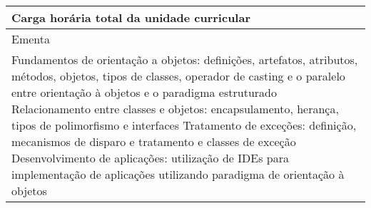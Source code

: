 \begin{quadro}[ht!]
\begin{tabular}{|p{3cm} p{2cm} p{3cm} p{2cm} p{3cm} p{2cm}|}
\multicolumn{5}{|p{13cm}|}{\cellcolor{blue1} Carga horária total da unidade curricular} & \multicolumn{1}{p{1cm}|}{\raggedleft 90	}\\\hline
\multicolumn{6}{|p{15cm}|}{\cellcolor{blue1} Ementa} \\\hline
\hline\multicolumn{6}{|p{15cm}|}{\scriptsize Fundamentos de orientação a objetos: definições, artefatos, atributos, métodos, objetos, tipos de classes, operador de casting e o paralelo entre orientação à objetos e o paradigma estruturado Relacionamento entre classes e objetos: encapsulamento, herança, tipos de polimorfismo e interfaces Tratamento de exceções: definição, mecanismos de disparo e tratamento e classes de exceção Desenvolvimento de aplicações: utilização de IDEs para implementação de aplicações utilizando paradigma de orientação à objetos}\\\hline
\hline
	\end{tabular}
\end{quadro}
